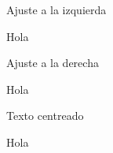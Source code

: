 \documentclass{article}
\begin{document}
  
  Ajuste a la izquierda
  \begin{flushleft}
    Hola
  \end{flushleft}

  Ajuste a la derecha
  \begin{flushright}
    Hola
  \end{flushright}

  Texto centreado
  \begin{center}
    Hola
  \end{center}
\end{document}
